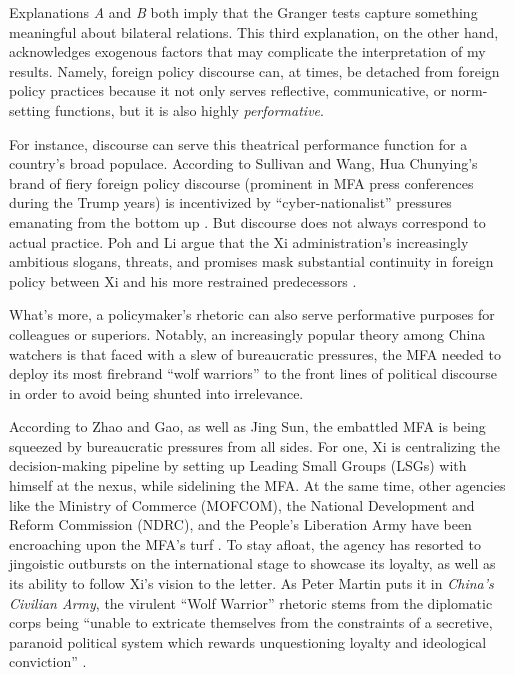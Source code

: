 \documentclass[12pt,letterpaper]{article}
\begin{document}
Explanations \emph{A} and \emph{B} both imply that the Granger tests capture something meaningful about bilateral relations. This third explanation, on the other hand, acknowledges exogenous factors that may complicate the interpretation of my results. Namely, foreign policy discourse can, at times, be detached from foreign policy practices because it not only serves reflective, communicative, or norm-setting functions, but it is also highly \emph{performative}.

For instance, discourse can serve this theatrical performance function for a country's broad populace. According to Sullivan and Wang, Hua Chunying's brand of fiery foreign policy discourse (prominent in MFA press conferences during the Trump years) is incentivized by ``cyber-nationalist'' pressures emanating from the bottom up \autocite{sullivan2023}. But discourse does not always correspond to actual practice. Poh and Li argue that the Xi administration's increasingly ambitious slogans, threats, and promises mask substantial continuity in foreign policy between Xi and his more restrained predecessors \autocite[95--97]{poh2017}.

What's more, a policymaker's rhetoric can also serve performative purposes for colleagues or superiors. Notably, an increasingly popular theory among China watchers is that faced with a slew of bureaucratic pressures, the MFA needed to deploy its most firebrand ``wolf warriors'' to the front lines of political discourse in order to avoid being shunted into irrelevance.

According to Zhao and Gao, as well as Jing Sun, the embattled MFA is being squeezed by bureaucratic pressures from all sides. For one, Xi is centralizing the decision-making pipeline by setting up Leading Small Groups (LSGs) with himself at the nexus, while sidelining the MFA. At the same time, other agencies like the Ministry of Commerce (MOFCOM), the National Development and Reform Commission (NDRC), and the People's Liberation Army have been encroaching upon the MFA's turf \autocites[420, 422]{sun2017}[47]{zhao2015}. To stay afloat, the agency has resorted to jingoistic outbursts on the international stage to showcase its loyalty, as well as its ability to follow Xi's vision to the letter. As Peter Martin puts it in \emph{China's Civilian Army}, the virulent ``Wolf Warrior'' rhetoric stems from the diplomatic corps being ``unable to extricate themselves from the constraints of a secretive, paranoid political system which rewards unquestioning loyalty and ideological conviction'' \autocite[5]{martin2021}.
\end{document}
